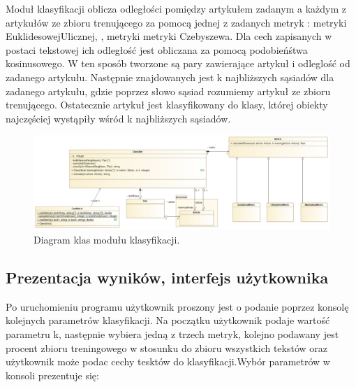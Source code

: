 \documentclass{classrep}
\begin{document}
Moduł klasyfikacji oblicza odległości pomiędzy artykułem zadanym a każdym z artykułów ze zbioru trenującego za pomocą jednej z zadanych metryk \cite{dane} : metryki EuklidesowejUlicznej, , metryki metryki Czebyszewa. Dla cech zapisanych w postaci tekstowej ich odległość jest obliczana za pomocą podobieńśtwa kosinusowego. W ten sposób tworzone są pary zawierające artykuł i odleglość od zadanego artykułu. Następnie znajdowanych jest k najbliższych sąsiadów dla zadanego artykułu, gdzie poprzez słowo sąsiad rozumiemy artykuł ze zbioru trenującego. Ostatecznie artykuł jest klasyfikowany do klasy, której obiekty najczęściej wystąpiły wśród k najbliższych sąsiadów. 

\begin{figure}[h!]
 \centering
 \includegraphics[width=14cm]{Klasyfikator.png}
 \vspace{-0.3cm}
 \caption{Diagram klas modułu klasyfikacji. }
 \label{rysunek do eksperymentu 1 wariantu 1}
\end{figure}

\newpage

\subsection{Prezentacja wyników, interfejs użytkownika} 
Po uruchomieniu programu użytkownik proszony jest o podanie poprzez konsolę kolejnych parametrów klasyfikacji. Na początku użytkownik podaje wartość parametru k, następnie wybiera jedną z trzech metryk, kolejno podawany jest procent zbioru treningowego w stosunku do zbioru wszystkich tekstów oraz użytkownik może podac cechy tesktów do klasyfikacji.Wybór parametrów w konsoli prezentuje się:
\end{document}
